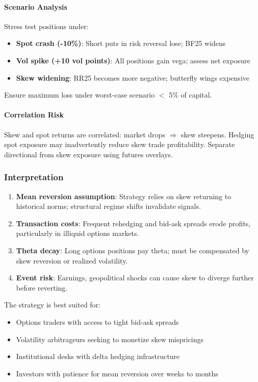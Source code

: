 \paragraph{Scenario Analysis}

Stress test positions under:
\begin{itemize}
  \item \textbf{Spot crash (-10\%)}: Short puts in risk reversal lose; BF25 widens
  \item \textbf{Vol spike (+10 vol points)}: All positions gain vega; assess net exposure
  \item \textbf{Skew widening}: RR25 becomes more negative; butterfly wings expensive
\end{itemize}
Ensure maximum loss under worst-case scenario $<$ 5\% of capital.

\paragraph{Correlation Risk}

Skew and spot returns are correlated: market drops $\Rightarrow$ skew steepens. Hedging spot exposure may inadvertently reduce skew trade profitability. Separate directional from skew exposure using futures overlays.

\subsubsection{Interpretation}

\begin{enumerate}
  \item \textbf{Mean reversion assumption}: Strategy relies on skew returning to historical norms; structural regime shifts invalidate signals.

  \item \textbf{Transaction costs}: Frequent rehedging and bid-ask spreads erode profits, particularly in illiquid options markets.

  \item \textbf{Theta decay}: Long options positions pay theta; must be compensated by skew reversion or realized volatility.

  \item \textbf{Event risk}: Earnings, geopolitical shocks can cause skew to diverge further before reverting.
\end{enumerate}

The strategy is best suited for:
\begin{itemize}
  \item Options traders with access to tight bid-ask spreads
  \item Volatility arbitrageurs seeking to monetize skew mispricings
  \item Institutional desks with delta hedging infrastructure
  \item Investors with patience for mean reversion over weeks to months
\end{itemize}

